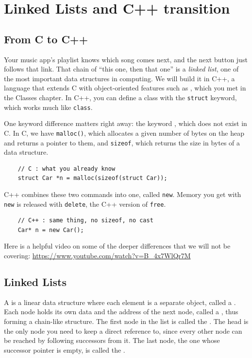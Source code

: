\chapter{Linked Lists and C++ transition}

\section{From C to C++}

Your music app's playlist knows which song comes next, and the next button just follows that link. That chain of ``this one, then that one'' is a \emph{linked list}, one of the most important data structures in computing. We will build it in C++, a language that extends C with object-oriented features such as , which you met in the Classes chapter. In C++, you can define a class with the \texttt{struct} keyword, which works much like \texttt{class}.

One keyword difference matters right away: the keyword , which does not exist in C. In C, we have \texttt{malloc()}, which allocates a given number of bytes on the heap and returns a pointer to them, and \texttt{sizeof}, which returns the size in bytes of a data structure.
\begin{verbatim}
    // C : what you already know
    struct Car *n = malloc(sizeof(struct Car));
\end{verbatim}
C++ combines these two commands into one, called \texttt{new}. Memory you get with \texttt{new} is released with \texttt{delete}, the C++ version of \texttt{free}.
\begin{verbatim}
    // C++ : same thing, no sizeof, no cast
    Car* n = new Car();
\end{verbatim}

Here is a helpful video on some of the deeper differences that we will not be covering: \url{https://www.youtube.com/watch?v=B_4x7WlQr7M}

\section{Linked Lists}

A  is a linear data structure where each element is a
separate object, called a . Each node holds its own data and the
address of the next node, called a , thus forming a chain-like structure. 
The first node in the list is called the . The head is the only node you need to keep a direct reference to, since every other node can be reached by following successors from it. The last node, the one whose successor pointer is empty, is called the .

